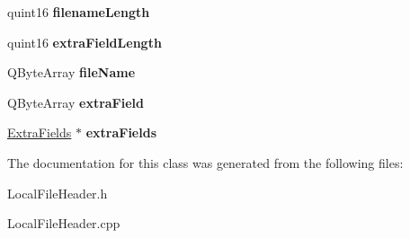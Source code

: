 \begin{DoxyCompactItemize}
\item 
quint16 {\bfseries filename\+Length}\hypertarget{class_local_file_header_abd88ba0e76ceb4a7d806b4388a618a06}{}\label{class_local_file_header_abd88ba0e76ceb4a7d806b4388a618a06}

\item 
quint16 {\bfseries extra\+Field\+Length}\hypertarget{class_local_file_header_a87187f44a2ae3e6fb31413bc85026836}{}\label{class_local_file_header_a87187f44a2ae3e6fb31413bc85026836}

\item 
Q\+Byte\+Array {\bfseries file\+Name}\hypertarget{class_local_file_header_a7a196568e07114379ea852a8f96fda3c}{}\label{class_local_file_header_a7a196568e07114379ea852a8f96fda3c}

\item 
Q\+Byte\+Array {\bfseries extra\+Field}\hypertarget{class_local_file_header_aeb9a94312e15b73dcd68bb948684a637}{}\label{class_local_file_header_aeb9a94312e15b73dcd68bb948684a637}

\item 
\hyperlink{class_extra_fields}{Extra\+Fields} $\ast$ {\bfseries extra\+Fields}\hypertarget{class_local_file_header_a4a8d3099ee583c2e6f734a7436087ed9}{}\label{class_local_file_header_a4a8d3099ee583c2e6f734a7436087ed9}

\end{DoxyCompactItemize}


The documentation for this class was generated from the following files\+:\begin{DoxyCompactItemize}
\item 
Local\+File\+Header.\+h\item 
Local\+File\+Header.\+cpp\end{DoxyCompactItemize}
